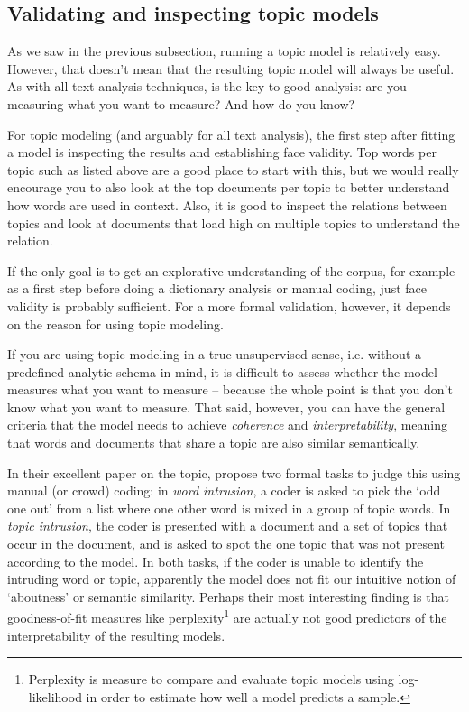 \subsection{Validating and inspecting topic models}

As we saw in the previous subsection, running a topic model is relatively easy.
However, that doesn't mean that the resulting topic model will always be useful.
As with all text analysis techniques,  is the key to good analysis:
are you measuring what you want to measure? And how do you know?

For topic modeling (and arguably for all text analysis),
the first step after fitting a model is inspecting the results and establishing face validity.
Top words per topic such as listed above are a good place to start with this,
but we would really encourage you to also look at the top documents per topic to better understand how words are used in context.
Also, it is good to inspect the relations between topics and look at documents that load high on multiple topics to understand the relation.

If the only goal is to get an explorative understanding of the corpus,
for example as a first step before doing a dictionary analysis or manual coding,
just face validity is probably sufficient.
For a more formal validation, however, it depends on the reason for using topic modeling.

If you are using topic modeling in a true unsupervised sense, i.e. without a predefined analytic schema in mind,
it is difficult to assess whether the model measures what you want to measure --
because the whole point is that you don't know what you want to measure.
That said, however, you can have the general criteria that the model needs to achieve \emph{coherence}
and \emph{interpretability}, meaning that words and documents that share a topic
are also similar semantically. 

In their excellent paper on the topic, \citet{chang09} propose two formal tasks to judge this
using manual (or crowd) coding: in \emph{word intrusion}, a coder is asked to pick the `odd one out' from a list
where one other word is mixed in a group of topic words.
In \emph{topic intrusion}, the coder is presented with a document and a set of topics that occur in the document,
and is asked to spot the one topic that was not present according to the model.
In both tasks, if the coder is unable to identify the intruding word or topic, apparently the model does not fit
our intuitive notion of `aboutness' or semantic similarity.
Perhaps their most interesting finding is that goodness-of-fit measures like perplexity\footnote{Perplexity is measure to compare and evaluate topic models using log-likelihood in order to estimate how well a model predicts a sample.} 
are actually not good predictors of the interpretability of the resulting models.

